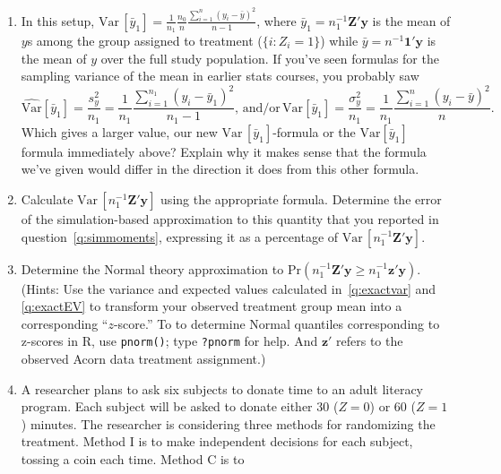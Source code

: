 \documentclass{article}
\begin{document}
\begin{enumerate}
\item In this setup, $\mathrm{Var}\, [\bar{y}_{1}]  = \frac{1}{n_{1}}
  \frac{n_0}{n} \frac{\sum_{i=1}^{n} (y_{i} - \bar y)^{2}}{n-1} $,
  where $\bar{y}_{1} = n_{1}^{-1}\mathbf{Z}'\mathbf{y}$ is the mean of
  $y$s among the group assigned to treatment ($\{i: Z_{i} =1\}$) while
  $\bar{y} = n^{-1}\mathbf{1}'\mathbf{y}$ is the mean of $y$ over
  the full study population.  If you've seen formulas for the sampling
  variance of the mean in earlier stats
  courses, you probably saw
  $$
  \widehat{\mathrm{Var}} \left[\bar{y}_{1}\right] = \frac{s^{2}_{y}}{n_{1}} = \frac{1}{n_{1}}
  \frac{\sum_{i=1}^{n_{1}} (y_{i} - \bar{y}_{1})^{2}}{n_{1}-1}, 
\, \mathrm{and/or}\,
  \mathrm{Var} \left[\bar{y}_{1}\right] = \frac{\sigma_{y}^{2}}{n_{1}} = \frac{1}{n_{1}}
  \frac{\sum_{i=1}^{n} (y_{i} - \bar{y})^{2}}{n}.
  $$
Which gives a larger value, our new $\mathrm{Var}\,
[\bar{y}_{1}]$-formula or the  $\mathrm{Var} \left[\bar{y}_{1}\right]$
formula immediately above?  Explain why it makes
sense that the formula we've given would differ in the direction it does
from this other formula. %
\item Calculate $\mathrm{Var}\, [n_{1}^{-1}\mathbf{Z}'\mathbf{y}]$ using the appropriate
  formula.   Determine the error of the simulation-based
  approximation to this quantity that you reported in question~\ref{q:simmoments},
  expressing it as a percentage of $\mathrm{Var}\,[ n_{1}^{-1}\mathbf{Z}'\mathbf{y}]$. \label{q:exactvar}
\item Determine the Normal theory approximation to
  $\mathrm{Pr}(n_{1}^{-1}\mathbf{Z}'\mathbf{y} \geq
  n_{1}^{-1}\mathbf{z}'\mathbf{y} ) $.  (Hints: Use the variance and
  expected values calculated in~\ref{q:exactvar} and \ref{q:exactEV} to transform your
  observed treatment group mean into a corresponding ``$z$-score.'' 
  To to determine Normal quantiles corresponding to z-scores in R, use
  \texttt{pnorm()}; type \texttt{?pnorm} for help. And $\mathbf{z}'$ refers to
  the observed Acorn data treatment assignment.)
\item %
A researcher plans to ask six subjects to donate time to an adult
literacy program. Each subject will be asked to donate either 30
($Z=0$) or 60 ($Z=1$)
minutes. The researcher is considering three methods for randomizing
the treatment. Method I is to make independent decisions for each
subject, tossing a coin each time. Method C is to

\end{enumerate}
\end{document}
